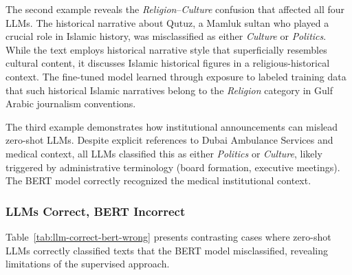 \documentclass[preprint,12pt,authoryear]{elsarticle}
\begin{document}
The second example reveals the \textit{Religion}--\textit{Culture} confusion that affected all four LLMs. The historical narrative about Qutuz, a Mamluk sultan who played a crucial role in Islamic history, was misclassified as either \textit{Culture} or \textit{Politics}. While the text employs historical narrative style that superficially resembles cultural content, it discusses Islamic historical figures in a religious-historical context. The fine-tuned model learned through exposure to labeled training data that such historical Islamic narratives belong to the \textit{Religion} category in Gulf Arabic journalism conventions.

The third example demonstrates how institutional announcements can mislead zero-shot LLMs. Despite explicit references to Dubai Ambulance Services and medical context, all LLMs classified this as either \textit{Politics} or \textit{Culture}, likely triggered by administrative terminology (board formation, executive meetings). The BERT model correctly recognized the medical institutional context.

\subsubsection{LLMs Correct, BERT Incorrect}

Table~\ref{tab:llm-correct-bert-wrong} presents contrasting cases where zero-shot LLMs correctly classified texts that the BERT model misclassified, revealing limitations of the supervised approach.
\end{document}
